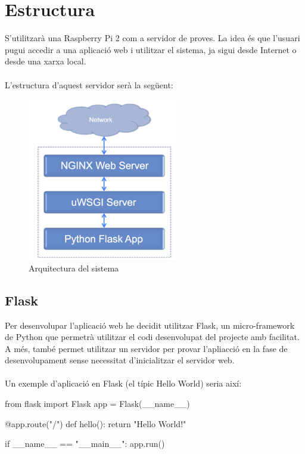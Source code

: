 \section{Estructura}
	S'utilitzarà una Raspberry Pi 2 com a servidor de proves. La idea és que l'usuari pugui accedir a una aplicació web i utilitzar el sistema, ja sigui desde Internet o desde una xarxa local.\\\\
	L'estructura d'aquest servidor serà la següent:\\
	\begin{figure}[H]
			\centering
			\includegraphics[width=0.6\textwidth]{images/server}
			\caption{Arquitectura del sistema}
	\end{figure}

	\subsection{Flask}
		Per desenvolupar l'aplicació web he decidit utilitzar Flask, un micro-framework de Python que permetrà utilitzar el codi desenvolupat del projecte amb facilitat.
		A més, també permet utilitzar un servidor per provar l'apliacció en la fase de desenvolupament sense necessitat d'inicialitzar el servidor web.\\\\
		Un exemple d'aplicació en Flask (el típic Hello World) seria així:\\
		\begin{python}
from flask import Flask
app = Flask(__name__)

@app.route("/")
def hello():
	return "Hello World!"

if __name__ == "__main__":
	app.run()
		\end{python}
